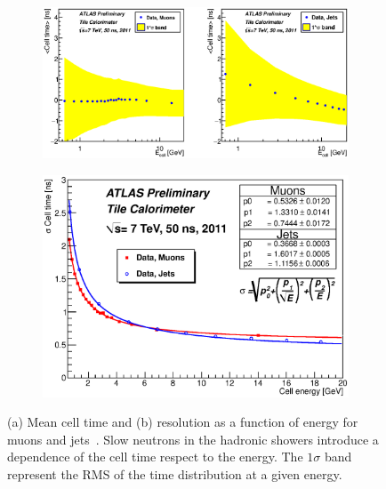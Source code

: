 \begin{figure}[p!]
  \begin{center}
    \begin{subfigure}{\textwidth}
      \includegraphics[width=\textwidth]{TileTimingPerformance/Figures/mean_merge.eps}
      \caption{}
      \label{fig:pub_mean}
    \end{subfigure}
    \begin{subfigure}{0.6\textwidth}
      \includegraphics[width=\textwidth]{TileTimingPerformance/Figures/pub_resolution.eps}
      \caption{}
      \label{fig:pub_res}
    \end{subfigure}
  \end{center}
  \caption{(a) Mean cell time and (b) resolution  as a function of energy for muons and jets~\cite{timingpublicplots}. Slow neutrons in the hadronic showers introduce a dependence of the cell time respect to the energy. The $1\sigma$ band represent the RMS of the time distribution at a given energy.}
  \label{fig:public}
\end{figure}


